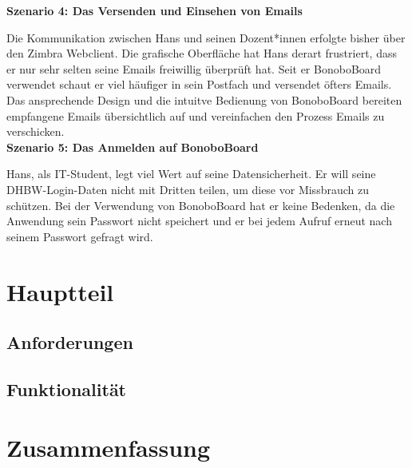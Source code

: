 \documentclass[a4paper,11pt]{scrartcl}
\begin{document}
\noindent\textbf{Szenario 4: Das Versenden und Einsehen von Emails} \par\noindent
Die Kommunikation zwischen Hans und seinen Dozent*innen erfolgte bisher über den Zimbra Webclient. Die grafische Oberfläche hat Hans derart frustriert, dass er nur sehr selten seine Emails freiwillig überprüft hat. Seit er BonoboBoard verwendet schaut er viel häufiger in sein Postfach und versendet öfters Emails. Das ansprechende Design und die intuitve Bedienung von BonoboBoard bereiten empfangene Emails  übersichtlich auf und vereinfachen den Prozess Emails zu verschicken. \\

\noindent\textbf{Szenario 5: Das Anmelden auf BonoboBoard} \par\noindent
Hans, als IT-Student, legt viel Wert auf seine Datensicherheit. Er will seine DHBW-Login-Daten nicht mit Dritten teilen, um diese vor Missbrauch zu schützen. Bei der Verwendung von BonoboBoard hat er keine Bedenken, da die Anwendung sein Passwort nicht speichert und er bei jedem Aufruf erneut nach seinem Passwort gefragt wird. 

\section{Hauptteil}
	\subsection{Anforderungen} %
	
	\subsection{Funktionalität} %
	
\section{Zusammenfassung}



\end{document}
